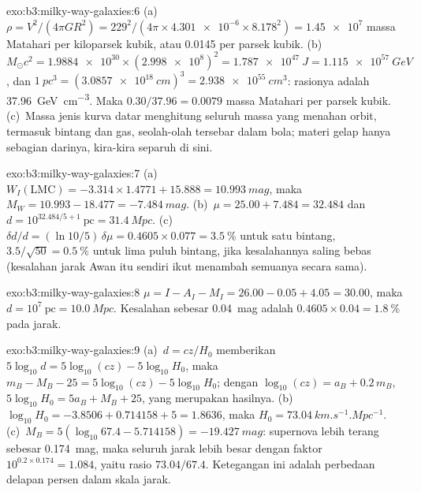 \begin{solution}{exo:b3:milky-way-galaxies:6}
(a)~$\rho = V^2/(4\pi GR^2) = 229^2/(4\pi\times\num{4.301e-6}\times
8.178^2) = \num{1.45e7}$ massa Matahari per kiloparsek kubik, atau
\num{0.0145} per parsek kubik. (b)~$M_\odot c^2 = \num{1.9884e30}\times
(\num{2.998e8})^2 = \qty{1.787e47}{J} = \qty{1.115e57}{GeV}$, dan
$\qty{1}{pc^3} = (\qty{3.0857e18}{cm})^3 = \qty{2.938e55}{cm^3}$: rasionya
adalah \qty{37.96}{GeV.cm^{-3}}. Maka $0.30/37.96 = \num{0.0079}$ massa Matahari
per parsek kubik. (c)~Massa jenis kurva datar menghitung seluruh massa
yang menahan orbit, termasuk bintang dan gas, seolah-olah tersebar dalam
bola; materi gelap hanya sebagian darinya, kira-kira separuh di sini.
\end{solution}

\begin{solution}{exo:b3:milky-way-galaxies:7}
(a)~$W_I(\mathrm{LMC}) = -3.314\times1.4771 + 15.888 = \qty{10.993}{mag}$,
maka $M_W = 10.993 - 18.477 = \qty{-7.484}{mag}$. (b)~$\mu = 25.00 + 7.484 =
32.484$ dan $d = 10^{32.484/5 + 1}~\mathrm{pc} = \qty{31.4}{Mpc}$.
(c)~$\delta d/d = (\ln 10/5)\,\delta\mu = 0.4605\times0.077 =
\qty{3.5}{\percent}$ untuk satu bintang, $3.5/\sqrt{50} = \qty{0.5}{\percent}$
untuk lima puluh bintang, jika kesalahannya saling bebas (kesalahan jarak Awan
itu sendiri ikut menambah semuanya secara sama).
\end{solution}

\begin{solution}{exo:b3:milky-way-galaxies:8}
$\mu = I - A_I - M_I = 26.00 - 0.05 + 4.05 = 30.00$, maka $d =
10^{7}~\mathrm{pc} = \qty{10.0}{Mpc}$. Kesalahan sebesar \qty{0.04}{mag} adalah
$0.4605\times0.04 = \qty{1.8}{\percent}$ pada jarak.
\end{solution}

\begin{solution}{exo:b3:milky-way-galaxies:9}
(a)~$d = cz/H_0$ memberikan $5\log_{10}d = 5\log_{10}(cz) - 5\log_{10}H_0$,
maka $m_B - M_B - 25 = 5\log_{10}(cz) - 5\log_{10}H_0$; dengan
$\log_{10}(cz) = a_B + 0.2\,m_B$, $5\log_{10}H_0 = 5a_B + M_B + 25$, yang
merupakan hasilnya. (b)~$\log_{10}H_0 = -3.8506 + 0.714158 + 5 = 1.8636$, maka
$H_0 = \qty{73.04}{km.s^{-1}.Mpc^{-1}}$. (c)~$M_B = 5(\log_{10}67.4 -
5.714158) = \qty{-19.427}{mag}$: supernova lebih terang sebesar \qty{0.174}{mag},
maka seluruh jarak lebih besar dengan faktor $10^{0.2\times0.174} = 1.084$, yaitu
rasio $73.04/67.4$. Ketegangan ini adalah perbedaan delapan persen dalam
skala jarak.
\end{solution}

